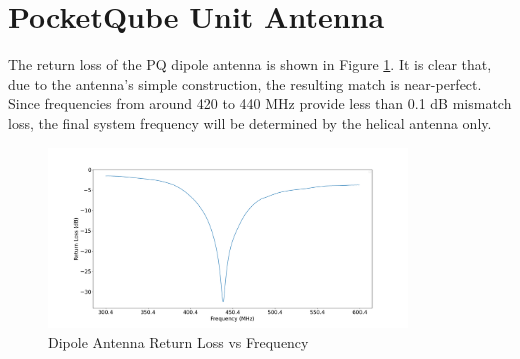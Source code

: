 \graphicspath{{./figures}}

\section{PocketQube Unit Antenna}

The return loss of the PQ dipole antenna is shown in Figure \ref{fig:dipoleReturnLoss}. It is clear that, due to the antenna's simple construction, the resulting match is near-perfect. Since frequencies from around 420 to 440 MHz provide less than 0.1 dB mismatch loss, the final system frequency will be determined by the helical antenna only.

\begin{figure}[!htb]
    \centering
    \includegraphics[width=0.85\textwidth]{dipoleReturnLoss}
    \caption{Dipole Antenna Return Loss vs Frequency}
    \label{fig:dipoleReturnLoss}
  \end{figure}